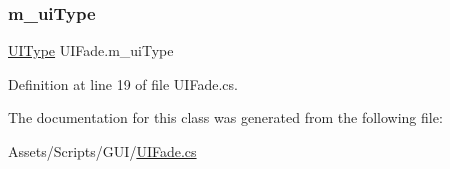 \mbox{\label{class_u_i_fade_a93a4a9d4c461da081d961a5f37974542}} 
\subsubsection{\texorpdfstring{m\+\_\+ui\+Type}{m\_uiType}}
{\footnotesize\ttfamily \mbox{\hyperlink{_u_i_fade_8cs_a9b4722689fa1a28f5f7e8f96c580efbe}{U\+I\+Type}} U\+I\+Fade.\+m\+\_\+ui\+Type}



Definition at line 19 of file U\+I\+Fade.\+cs.



The documentation for this class was generated from the following file\+:\begin{DoxyCompactItemize}
\item 
Assets/\+Scripts/\+G\+U\+I/\mbox{\hyperlink{_u_i_fade_8cs}{U\+I\+Fade.\+cs}}\end{DoxyCompactItemize}
